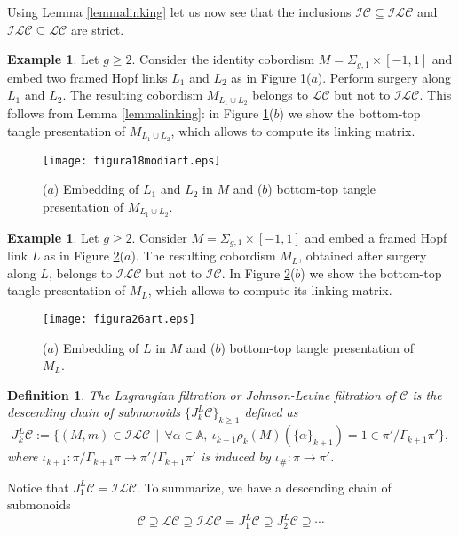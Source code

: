 \documentclass[10pt]{amsart}
\numberwithin{equation}{section}
\numberwithin{equation}{section}
\newtheorem{definition}[theorem]{Definition}
\theoremstyle{definition}
\newtheorem{example}[theorem]{Example}
\begin{document}
Using Lemma \ref{lemmalinking} let us now see that the inclusions $\mathcal{IC}\subseteq\mathcal{ILC}$ and $\mathcal{ILC}\subseteq\mathcal{LC}$ are strict.

\begin{example}\label{ejemplohopfs} Let $g\geq2$. Consider the identity cobordism $M=\Sigma_{g,1}\times[-1,1]$ and embed two framed Hopf links $L_1$ and $L_2$ as in Figure \ref{figura18}($a$). Perform  surgery along $L_1$ and $L_2$. The resulting cobordism $M_{L_1\cup L_2}$ belongs to $\mathcal{LC}$ but not to $\mathcal{ILC}$. This follows from Lemma \ref{lemmalinking}: in Figure \ref{figura18}($b$) we show the bottom-top tangle presentation of $M_{L_1\cup L_2}$, which allows to compute its linking matrix.
\begin{figure}[ht!]
										\centering
                        \texttt{[image: figura18modiart.eps]}
												\caption{($a$) Embedding of $L_1$ and $L_2$  in $M$ and ($b$) bottom-top tangle presentation of $M_{L_1\cup L_2}$.}
												\label{figura18}
\end{figure}
\end{example}

\begin{example}\label{ejemplohopf} Let $g\geq2$. Consider  $M=\Sigma_{g,1}\times[-1,1]$ and embed a framed Hopf link $L$  as in Figure \ref{figura26}($a$).  The  resulting cobordism $M_{L}$, obtained after  surgery along $L$, belongs to $\mathcal{ILC}$ but not to $\mathcal{IC}$. In Figure \ref{figura26}($b$) we show the bottom-top tangle presentation of $M_{L}$, which allows to compute its linking matrix.
\begin{figure}[ht!]
										\centering
                        \texttt{[image: figura26art.eps]}
												\caption{($a$) Embedding of $L$  in $M$ and ($b$) bottom-top tangle presentation of $M_L$.}
												\label{figura26}
\end{figure}
\end{example}


\begin{definition} The \emph{Lagrangian filtration} or \emph{Johnson-Levine filtration}  of $\mathcal{C}$ is the descending chain of submonoids $\{J_k^L\mathcal{C}\}_{k\geq1}$ defined as
$$J_k^L\mathcal{C}:=\{(M,m)\in \mathcal{ILC}\ \ |\ \ \forall\alpha\in\mathbb{A},\  \iota_{k+1}\rho_{k}(M)(\{\alpha\}_{k+1})=1\in\pi'/\Gamma_{k+1}\pi'\},$$
where $\iota_{k+1}:\pi/\Gamma_{k+1}\pi\rightarrow\pi'/\Gamma_{k+1}\pi'$ is  induced by $\iota_{\#}:\pi\rightarrow\pi'$.
\end{definition}
Notice that $J_1^L\mathcal{C}=\mathcal{ILC}$. To summarize, we have a descending chain of submonoids
\begin{equation}\label{ecuacion3.82}%
\mathcal{C}\supseteq\mathcal{LC}\supseteq \mathcal{ILC}=J_1^L\mathcal{C}\supseteq J_2^L\mathcal{C}\supseteq\cdots
\end{equation} 
\end{document}
